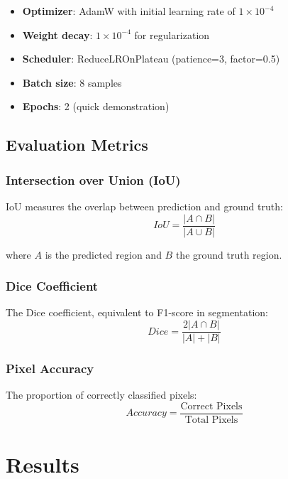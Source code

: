\documentclass[12pt,a4paper]{article}
\begin{document}
\begin{itemize}
    \item \textbf{Optimizer}: AdamW with initial learning rate of $1 \times 10^{-4}$
    \item \textbf{Weight decay}: $1 \times 10^{-4}$ for regularization
    \item \textbf{Scheduler}: ReduceLROnPlateau (patience=3, factor=0.5)
    \item \textbf{Batch size}: 8 samples
    \item \textbf{Epochs}: 2 (quick demonstration)
\end{itemize}

\subsection{Evaluation Metrics}

\subsubsection{Intersection over Union (IoU)}

IoU measures the overlap between prediction and ground truth:
\begin{equation}
IoU = \frac{|A \cap B|}{|A \cup B|}
\end{equation}

where $A$ is the predicted region and $B$ the ground truth region.

\subsubsection{Dice Coefficient}

The Dice coefficient, equivalent to F1-score in segmentation:
\begin{equation}
Dice = \frac{2|A \cap B|}{|A| + |B|}
\end{equation}

\subsubsection{Pixel Accuracy}

The proportion of correctly classified pixels:
\begin{equation}
Accuracy = \frac{\text{Correct Pixels}}{\text{Total Pixels}}
\end{equation}

\section{Results}
\end{document}

